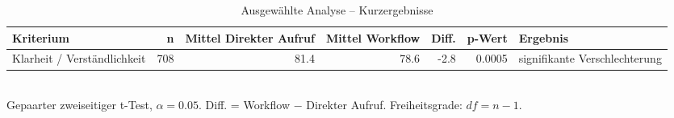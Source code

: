 \begin{table}[htbp]
\centering
\caption{Ausgewählte Analyse -- Kurzergebnisse}
\begin{tabular}{lrrrrrl}
\toprule
Kriterium & n & Mittel Direkter Aufruf & Mittel Workflow & Diff. & p-Wert & Ergebnis \\
\midrule
Klarheit / Verständlichkeit & 708 & 81.4 & 78.6 & -2.8 & 0.0005 & signifikante Verschlechterung \\
\bottomrule
\end{tabular}
\\[2mm]
\footnotesize Gepaarter zweiseitiger t-Test, $\alpha=0.05$. Diff. = Workflow $-$ Direkter Aufruf. Freiheitsgrade: $df=n-1$.
\end{table}
